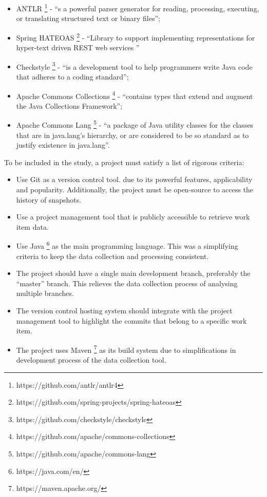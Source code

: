 \documentclass{mpaper}
\begin{document}
\begin{itemize}
	\item ANTLR \footnote{https://github.com/antlr/antlr4} - ``s a powerful parser
	      generator for reading, processing, executing, or translating structured text
	      or binary files'';
	\item Spring HATEOAS
	      \footnote{https://github.com/spring-projects/spring-hateoas} - ``Library to
	      support implementing representations for hyper-text driven REST web services
	      ''
	\item Checkstyle \footnote{https://github.com/checkstyle/checkstyle} - ``is a
	      development tool to help programmers write Java code that adheres to a coding
	      standard'';
	\item Apache Commons Collections
	      \footnote{https://github.com/apache/commons-collections} - ``contains types
	      that extend and augment the Java Collections Framework'';
	\item Apache Commons Lang \footnote{https://github.com/apache/commons-lang} -
	      ``a package of Java utility classes for the classes that are in java.lang's
	      hierarchy, or are considered to be so standard as to justify existence in
	      java.lang''.
\end{itemize}

To be included in the study, a project must satisfy a list of rigorous criteria:

\begin{itemize}
  \item Use Git as a version control tool. due to its powerful features,
  applicability and popularity. Additionally, the project must be open-source to
  access the history of snapshots.
  \item Use a project management tool that is publicly accessible to retrieve
  work item data.
  \item Use Java \footnote{https://java.com/en/} as the main programming
  language. This was a simplifying criteria to keep the data collection and
  processing consistent.
  \item The project should have a single main development branch, preferably the
  ``master'' branch. This relieves the data collection process of analysing
  multiple branches.
  \item The version control hosting system should integrate with the project
  management tool to highlight the commits that belong to a specific work item.
  \item The project uses Maven \footnote{https://maven.apache.org/} as its build
  system due to simplifications in development process of the data collection
  tool.
\end{itemize}
\end{document}
